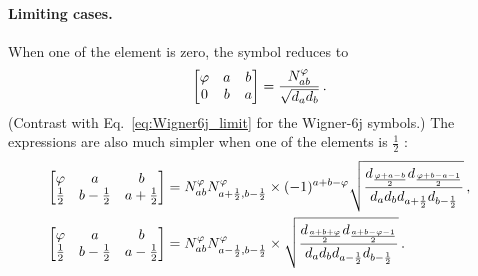 \paragraph{Limiting cases.}
When one of the element is zero, the symbol reduces to
\begin{align}
	\begin{bmatrix} \varphi & a & b \\ 0 & b & a \end{bmatrix} = \frac{N_{ab}^\varphi}{\sqrt{d_a d_b}} \,.
\end{align}
(Contrast with Eq.~\eqref{eq:Wigner6j_limit} for the Wigner-6j symbols.)
The expressions are also much simpler when one of the elements is $\frac12$ \cite{Lienert1992}:
\begin{subequations} \label{tetrahalf} \begin{align}
	\begin{bmatrix} \varphi & a &b \\ \frac12 & b-\frac12 & a+\frac12 \end{bmatrix} &= N_{ab}^\varphi N_{a+\frac12,b-\frac12}^\varphi \times (-1)^{a+b-\varphi} \sqrt{\frac{d_{\frac{\varphi+a-b}{2}} d_{\frac{\varphi+b-a-1}{2}}}{d_a d_b d_{a+\frac12} d_{b-\frac12}}} \,,
\\	\begin{bmatrix} \varphi & a &b \\ \frac12 & b-\frac12 & a-\frac12 \end{bmatrix} &= N_{ab}^\varphi N_{a-\frac12,b-\frac12}^\varphi \times \sqrt{\frac{d_{\frac{a+b+\varphi}{2}} d_{\frac{a+b-\varphi-1}{2}}}{d_a d_b d_{a-\frac12} d_{b-\frac12}}} \,.
\end{align}\end{subequations}


